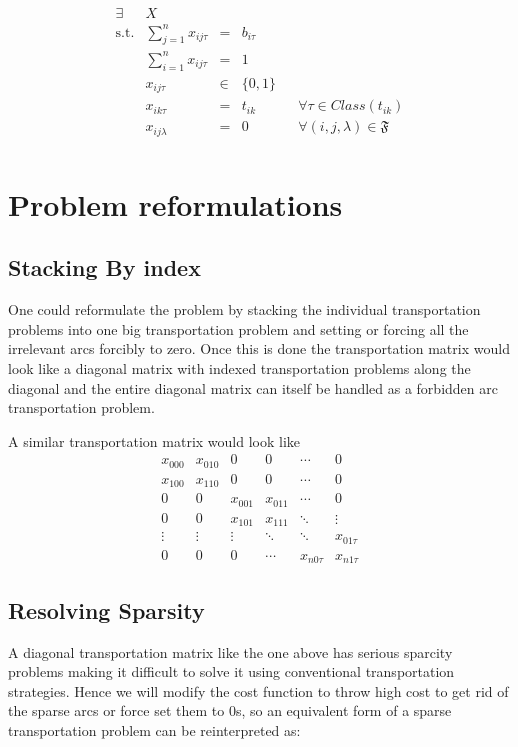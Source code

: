 \documentclass[a4paper]{article}
\begin{document}
        \begin{equation}
        \begin{array}{rrclcl}
        \displaystyle \exists &X \\
        \textrm{s.t.} & \sum_{j=1}^n x_{ij\tau}  & = & b_{i\tau} \\
        & \sum_{i=1}^n x_{ij\tau}  & = & 1 \\
        & x_{ij\tau} & \in &\{0,1\} \\
        & x_{ik\tau} &= & t_{ik} && \forall {\tau}\in Class(t_{ik}) \\
        & x_{ij\lambda} & = & 0 && \forall {(i,j,\lambda)}\in \mathfrak{F}\\
        \end{array}
        \end{equation}
        
    \section{Problem reformulations}
    \subsection{Stacking By index}
    One could reformulate the problem by stacking the individual transportation problems into one big transportation problem and setting or forcing all the irrelevant arcs forcibly to zero. Once this is done the transportation matrix would look like a diagonal matrix with indexed transportation problems along the diagonal and the entire diagonal matrix can itself be handled as a forbidden arc transportation problem.
    
    A similar transportation matrix would look like
        \[
        \begin{matrix}
            x_{000} & x_{010} & 0 & 0 & \cdots & 0  \\
            x_{100} & x_{110} & 0 & 0 & \cdots & 0  \\
            0 & 0 & x_{001} & x_{011}& \cdots & 0  \\
            0 & 0 & x_{101} & x_{111} & \ddots & \vdots \\
            \vdots & \vdots & \vdots & \ddots & \ddots &  x_{01\tau}  \\
            0 & 0 & 0 & \cdots & x_{n0\tau} & x_{n1\tau}
        \end{matrix}
    \]
    
    \subsection{Resolving Sparsity}
    A diagonal transportation matrix like the one above has serious sparcity problems making it difficult to solve it using conventional transportation strategies. Hence we will modify the cost function to throw high cost to get rid of the sparse arcs or force set them to 0s, so an equivalent form of a sparse transportation problem can be reinterpreted as:
    
\end{document}
